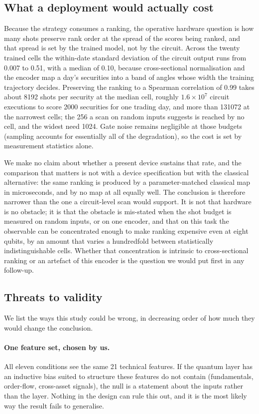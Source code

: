 \subsection{What a deployment would actually cost}
Because the strategy consumes a ranking, the operative hardware question is how
many shots preserve rank order at the spread of the scores being ranked, and
that spread is set by the trained model, not by the circuit. Across the twenty
trained cells the within-date standard deviation of the circuit output runs
from \num{0.007} to \num{0.51}, with a median of \num{0.10}, because
cross-sectional normalisation and the encoder map a day's securities into a
band of angles whose width the training trajectory decides. Preserving the
ranking to a Spearman correlation of \num{0.99} takes about \num{8192} shots
per security at the median cell, roughly $1.6\times10^{7}$ circuit executions
to score \num{2000} securities for one trading day, and more than
\num{131072} at the narrowest cells; the \num{256} a scan on random inputs
suggests is reached by no cell, and the widest need \num{1024}. Gate noise remains negligible at those budgets
(sampling accounts for essentially all of the degradation), so the cost is set
by measurement statistics alone.

We make no claim about whether a present device sustains that rate, and the
comparison that matters is not with a device specification but with the
classical alternative: the same ranking is produced by a parameter-matched
classical map in microseconds, and by no map at all equally well. The
conclusion is therefore narrower than the one a circuit-level scan would
support. It is not that hardware is no obstacle; it is that the obstacle is
mis-stated when the shot budget is measured on random inputs, or on one
encoder, and that on this task the observable can be concentrated enough to
make ranking expensive even at eight qubits, by an amount that varies a
hundredfold between statistically indistinguishable cells. Whether that
concentration is intrinsic to cross-sectional ranking or an artefact of this
encoder is the question we would put first in
any follow-up.

\subsection{Threats to validity}
\label{sec:discussion:threats}
We list the ways this study could be wrong, in decreasing order of how much
they would change the conclusion.

\paragraph{One feature set, chosen by us.}
All eleven conditions see the same \num{21} technical features. If the quantum
layer has an inductive bias suited to structure these features do not contain
(fundamentals, order-flow, cross-asset signals), the null is a statement
about the inputs rather than the layer. Nothing in the design can rule this
out, and it is the most likely way the result fails to generalise.

